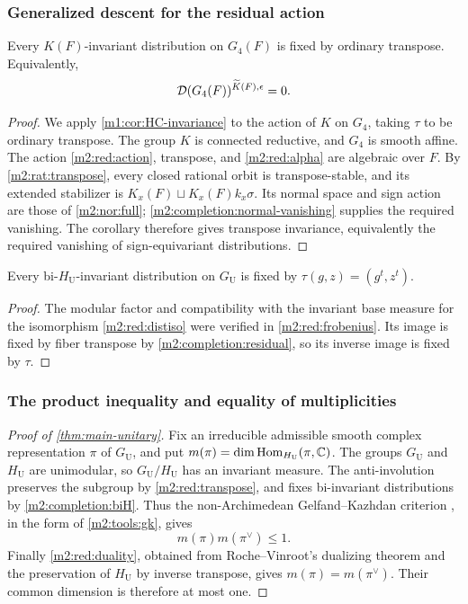 \subsubsection{Generalized descent for the residual action}

\begin{theorem}\label{m2:completion:residual}
Every $K(F)$-invariant distribution on $G_4(F)$ is fixed by
ordinary transpose. Equivalently,
\[
 \mathcal D(G_4(F))^{\widetilde K(F),\epsilon}=0.
\]
\end{theorem}

\begin{proof}
We apply \cref{m1:cor:HC-invariance} to the action of $K$ on
$G_4$, taking $\tau$ to be ordinary transpose. The group $K$ is connected
reductive, and $G_4$ is smooth affine. The action
\eqref{m2:red:action}, transpose, and \eqref{m2:red:alpha} are
algebraic over $F$. By \cref{m2:rat:transpose}, every closed rational
orbit is transpose-stable, and its extended stabilizer is
$K_x(F)\sqcup K_x(F)k_x\sigma$. Its normal space and sign action
are those of \cref{m2:nor:full};
\cref{m2:completion:normal-vanishing} supplies the required vanishing.
The corollary therefore gives transpose invariance, equivalently
the required vanishing of sign-equivariant distributions.
\end{proof}

\begin{corollary}\label{m2:completion:biH}
Every bi-$H_{\mathrm U}$-invariant distribution on $G_{\mathrm U}$ is fixed by
$\tau(g,z)=(g^t,z^t)$.
\end{corollary}

\begin{proof}
The modular factor and compatibility with the invariant base measure
for the isomorphism \eqref{m2:red:distiso} were verified in
\cref{m2:red:frobenius}. Its image is fixed by fiber transpose
by \cref{m2:completion:residual}, so its inverse image is fixed by
$\tau$.
\end{proof}

\subsubsection{The product inequality and equality of multiplicities}

\begin{proof}[Proof of \cref{thm:main-unitary}]
Fix an irreducible admissible smooth complex representation
$\pi$ of $G_{\mathrm U}$, and put
$m(\pi)=\dim\operatorname{Hom}_{H_{\mathrm U}}(\pi,\mathbb C)$.
The groups $G_{\mathrm U}$ and $H_{\mathrm U}$ are unimodular, so $G_{\mathrm U}/H_{\mathrm U}$
has an invariant measure. The anti-involution preserves the
subgroup by \cref{m2:red:transpose}, and fixes bi-invariant
distributions by \cref{m2:completion:biH}. Thus the
non-Archimedean Gelfand--Kazhdan criterion
\cite[Lemma~4.2]{Prasad90}, in the form of \cref{m2:tools:gk},
gives
\[
 m(\pi)m(\pi^\vee)\leq1.
\]
Finally \cref{m2:red:duality}, obtained from
Roche--Vinroot's dualizing theorem and the preservation of $H_{\mathrm U}$
by inverse transpose, gives $m(\pi)=m(\pi^\vee)$. Their common
dimension is therefore at most one.
\end{proof}
